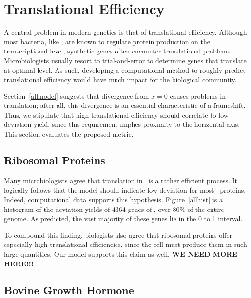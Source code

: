 \documentclass[12pt, draft]{article}
\numberwithin{equation}{section}
\begin{document}
\section{Translational Efficiency}


A central problem in modern genetics is that of translational efficiency.
Although most bacteria, like \ecoli, are known to regulate protein production
on the transcriptional level, synthetic genes often encounter translational
problems.  Microbiologists usually resort to trial-and-error to determine genes
that translate at optimal level.  As such, developing a computational method
to roughly predict translational efficiency would have much impact for the 
biological community.

Section~\ref{allmodel} suggests that divergence from $x=0$ causes
problems in translation; after all, this divergence is an essential characteristic
of a frameshift.  Thus, we stipulate that high translational efficiency should correlate to low deviation yield,
since this requirement implies proximity to the horizontal axis.  This section
evaluates the proposed metric.

\subsection{Ribosomal Proteins}


Many microbiologists agree that translation in \ecoli\ is a rather efficient
process.  It logically follows that the model should indicate low deviation
for most \ecoli\ proteins.  Indeed, computational data supports this hypothesis.
Figure~\ref{allhist} is a histogram of the deviation yields of 4364 genes of
\ecoli, over 80\% of the entire genome.  As predicted, the vast majority
of these genes lie in the 0 to 1 interval.

To compound this finding, biologists also agree that ribosomal proteins
offer especially high translational efficiencies, since the cell must produce
them in such large quantities.  Our model supports this claim as well.
{\textbf{WE NEED MORE HERE!!!}}

\subsection{Bovine Growth Hormone}

\end{document}
